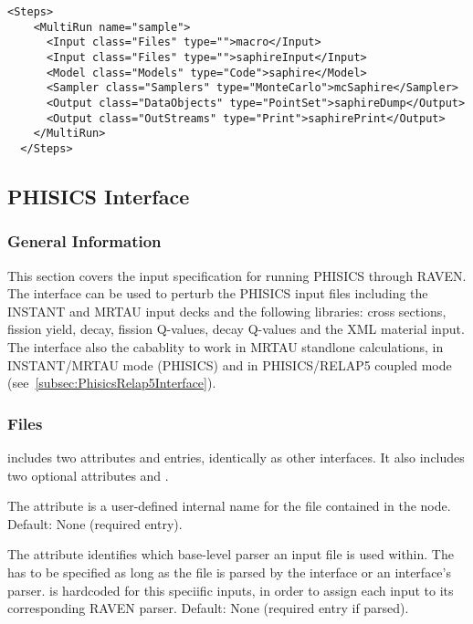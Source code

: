 \begin{lstlisting}[style=XML]
  <Steps>
    <MultiRun name="sample">
      <Input class="Files" type="">macro</Input>
      <Input class="Files" type="">saphireInput</Input>
      <Model class="Models" type="Code">saphire</Model>
      <Sampler class="Samplers" type="MonteCarlo">mcSaphire</Sampler>
      <Output class="DataObjects" type="PointSet">saphireDump</Output>
      <Output class="OutStreams" type="Print">saphirePrint</Output>
    </MultiRun>
  </Steps>
\end{lstlisting}
\subsection{PHISICS Interface}
\label{subsec:PhisicsInterface}
%
\subsubsection{General Information}
%
This section covers the input specification for running PHISICS through RAVEN.
The interface can be used to perturb the PHISICS input files including the INSTANT and MRTAU input decks
and the following libraries: cross sections, fission yield, decay, fission Q-values, decay Q-values and the XML material input.
The interface also the cabablity to work in MRTAU standlone calculations, in INSTANT/MRTAU mode (PHISICS) and
in PHISICS/RELAP5 coupled mode (see~\ref{subsec:PhisicsRelap5Interface}).
%
\subsubsection{Files}
\label{subsubsec:PhisicsInterfaceFiles}
 includes two attributes  and  entries, identically as other interfaces.
It also includes two optional attributes  and .

The  attribute is a user-defined internal name for the file contained in the node.
Default: None (required entry).

The  attribute identifies which base-level parser an input file is used within.  The  has to be specified as long as the
file is parsed by the interface or an interface's parser.  is hardcoded for this speciific inputs, in order to assign each input to its corresponding RAVEN parser.
Default: None (required entry if parsed).

